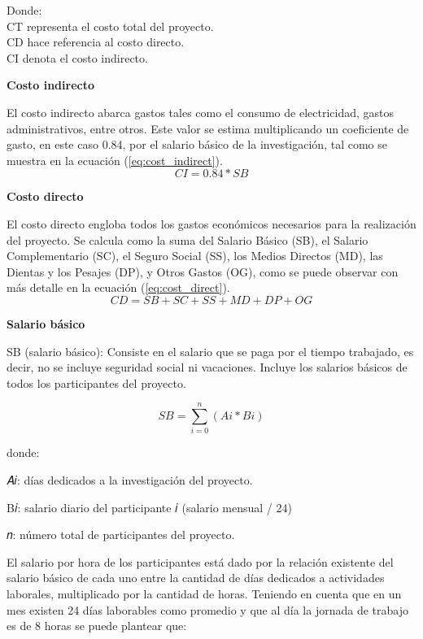 Donde: \\
CT representa el costo total del proyecto. \\
CD hace referencia al costo directo. \\
CI denota el costo indirecto.

\textbf{Costo indirecto}

El costo indirecto abarca gastos tales como el consumo de electricidad, gastos administrativos, entre otros.
Este valor se estima multiplicando un coeficiente de gasto, en este caso 0.84, por el salario básico de la
investigación, tal como se muestra en la ecuación (\ref{eq:cost_indirect}). \\

\begin{equation}
    \label{eq:cost_indirect}
    CI = 0.84 * SB
\end{equation}

\textbf{Costo directo}

El costo directo engloba todos los gastos económicos necesarios para la realización del proyecto. Se
calcula como la suma del Salario Básico (SB), el Salario Complementario (SC), el Seguro Social (SS), los
Medios Directos (MD), las Dientas y los Pesajes (DP), y Otros Gastos (OG), como se puede observar con más
detalle en la ecuación (\ref{eq:cost_direct}). \\

\begin{equation}
    \label{eq:cost_direct}
    CD = SB + SC + SS + MD + DP + OG
\end{equation}

\textbf{Salario básico}

SB (salario básico): Consiste en el salario que se paga por el tiempo trabajado, es decir, no se incluye seguridad social ni vacaciones. Incluye los salarios básicos de todos los participantes del proyecto.


\begin{equation}
    \label{eq:sal_basico}
    SB = \sum_{i = 0}^{n} (Ai * Bi)
\end{equation}

donde:

𝐴𝑖: días dedicados a la investigación del proyecto.

B𝑖: salario diario del participante 𝑖 (salario mensual / 24)

𝑛: número total de participantes del proyecto.

El salario por hora de los participantes está dado por la relación existente del salario
básico de cada uno entre la cantidad de días dedicados a actividades laborales,
multiplicado por la cantidad de horas. Teniendo en cuenta que en un mes existen 24
días laborables como promedio y que al día la jornada de trabajo es de 8 horas se
puede plantear que:\\

